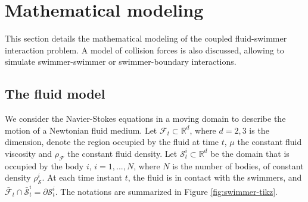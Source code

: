 \documentclass[graybox]{svmult}
\newcommand{\Fluid}{\mathcal{F}} %
\newcommand{\Real}{\mathbb{R}} %
\newcommand{\Density}{\rho} %
\newcommand{\Solid}{\mathcal{S}} %
\newcommand{\CompDomain}{\Fluid}
\newcommand{\R}{\mathbb{R}}
\begin{document}





\section{Mathematical modeling}
\label{Sec:MathModeling}
This section details the mathematical modeling of the coupled fluid-swimmer interaction problem. A model of collision forces is also discussed, allowing to simulate swimmer-swimmer or swimmer-boundary interactions.


\subsection{The fluid model}

We consider the Navier-Stokes equations in a moving domain to describe the motion of a Newtonian fluid medium. 
Let $\CompDomain_t\subset \R^d$, where $d=2,3$ is the dimension, denote the region occupied by the fluid at time $t$, $\mu$  the constant fluid viscosity and $\Density_\Fluid$ the constant fluid density. Let $\Solid_t^i \subset \R^d$ be the domain that is occupied by the body $i$, $i = 1,...,N$, where $N$ is the number of bodies, of constant density $\Density_\Solid^i$. At each time instant $t$, the fluid is in contact with the swimmers, and $\bar{\CompDomain}_{t} \cap \bar{\Solid}_t^i = \partial \Solid_t^i$.
The notations are summarized in Figure \ref{fig:swimmer-tikz}.
\end{document}
